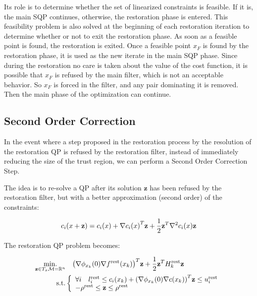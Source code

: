 Its role is to determine whether the set of linearized constraints is feasible.
If it is, the main SQP continues, otherwise, the restoration phase is entered.
This feasibility problem is also solved at the beginning of each restoration iteration to determine whether or not to exit the restoration phase.
As soon as a feasible point is found, the restoration is exited.
Once a feasible point $x_F$ is found by the restoration phase, it is used as the new iterate in the main SQP phase.
Since during the restoration no care is taken about the value of the cost function, it is possible that $x_F$ is refused by the main filter, which is not an acceptable behavior.
So $x_F$ is forced in the filter, and any pair dominating it is removed.
Then the main phase of the optimization can continue.

\subsection{Second Order Correction}
\label{sub:second_order_correction}

In the event where a step proposed in the restoration process by the resolution of the restoration QP is refused by the restoration filter, instead of immediately reducing the size of the trust region, we can perform a Second Order Correction Step.

The idea is to re-solve a QP after its solution $\mathbf{z}$ has been refused by the restoration filter, but with a better approximation (second order) of the constraints:

\begin{equation}
  c_i(x+{\bf z}) = c_i(x) + {\nabla c_i(x)}^T {\bf z} + \frac{1}{2}{\bf z}^T{\nabla}^2c_i(x){\bf z}
\end{equation}

The restoration QP problem becomes:

\begin{align}
  \label{eq:QP_soc}
  \begin{split}
  \operatorname*{min.}_{\mathbf{z} \in T_x\mathcal{M}=\mathbb{R}^n } & \quad {\left(\nabla\phi_{x_k}(0) \nabla f^\text{rest} (x_k)\right)}^T\mathbf{z} + \frac{1}{2} {\bf z }^T H^\text{rest}_k{\bf z }\\
  \text{s.t.}&\left\{
  \begin{array}{lr}
    \forall i \quad l^\text{rest}_i \leq c_i(x_k) + {\left(\nabla\phi_{x_k}(0) \nabla c (x_k)\right)}^T\mathbf{z} \leq u^\text{rest}_i \\
    -\rho^\text{rest} \leq \mathbf{z} \leq \rho^\text{rest} \\
  \end{array}\right.
  \end{split}
\end{align}

